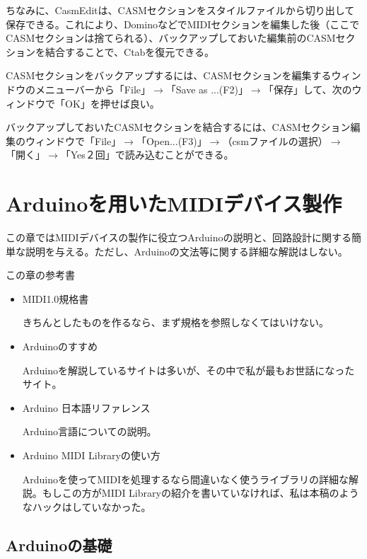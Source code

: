 \documentclass[uplatex, 10pt, dvipdfmx]{jsarticle}
\numberwithin{equation}{section}
\begin{document}
ちなみに、CasmEditは、CASMセクションをスタイルファイルから切り出して保存できる。これにより、DominoなどでMIDIセクションを編集した後（ここでCASMセクションは捨てられる）、バックアップしておいた編集前のCASMセクションを結合することで、Ctabを復元できる。

CASMセクションをバックアップするには、CASMセクションを編集するウィンドウのメニューバーから「File」$\rightarrow$「Save as ...(F2)」$\rightarrow$「保存」して、次のウィンドウで「OK」を押せば良い。

バックアップしておいたCASMセクションを結合するには、CASMセクション編集のウィンドウで「File」$\rightarrow$「Open...(F3)」$\rightarrow$（csmファイルの選択）$\rightarrow$「開く」$\rightarrow$「Yes２回」で読み込むことができる。

\clearpage

\section{Arduinoを用いたMIDIデバイス製作}
この章ではMIDIデバイスの製作に役立つArduinoの説明と、回路設計に関する簡単な説明を与える。ただし、Arduinoの文法等に関する詳細な解説はしない。
\begin{itembox}{この章の参考書}
\begin{itemize}
\item MIDI1.0規格書\cite{規格}

きちんとしたものを作るなら、まず規格を参照しなくてはいけない。

\item Arduinoのすすめ\cite{Arduinoのすすめ}

Arduinoを解説しているサイトは多いが、その中で私が最もお世話になったサイト。

\item Arduino 日本語リファレンス\cite{Arduinoリファレンス}

Arduino言語についての説明。

\item Arduino MIDI Libraryの使い方\cite{ArduinoMIDILib}

Arduinoを使ってMIDIを処理するなら間違いなく使うライブラリの詳細な解説。もしこの方がMIDI Libraryの紹介を書いていなければ、私は本稿のようなハックはしていなかった。
\end{itemize}
\end{itembox}

\subsection{Arduinoの基礎}
\end{document}

